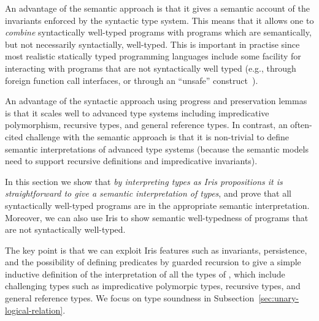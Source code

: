 An advantage of the semantic approach is that it gives a semantic account of the invariants
enforced by the syntactic type system. This means that it allows one
to \emph{combine} syntactically well-typed programs with programs which are
semantically, but not necessarily syntactially, well-typed. This is
important in practise since most realistic statically typed programming
languages include some facility for interacting with programs that are
not syntactically well typed (e.g., through foreign function call
interfaces, or through an ``unsafe'' construct~\cite{}). 

An advantage of the syntactic approach using progress and preservation
lemmas is that it scales well to advanced type systems including
impredicative polymorphism, recursive types, and general reference
types. In contrast, an often-cited challenge with the semantic
approach is that it is non-trivial to define semantic interpretations of advanced type
systems (because the semantic models need to support recursive
definitions and impredicative invariants). 

In this section we show that \emph{by interpreting types as 
Iris propositions it is straightforward to give a semantic
interpretation of types}, and prove that all syntactically well-typed
programs are in the appropriate semantic interpretation. Moreover,
we can also use Iris to show semantic well-typedness of 
programs that are not syntactically well-typed.

The key point is that we can exploit Iris features such as invariants, persistence, and the possibility of defining predicates by guarded recursion to give a simple inductive definition of the interpretation of all the types of \TheLang, which include challenging types such as impredicative polymorpic types, recursive types, and general reference types.
We focus on type soundness in Subsection~\ref{sec:unary-logical-relation}.

